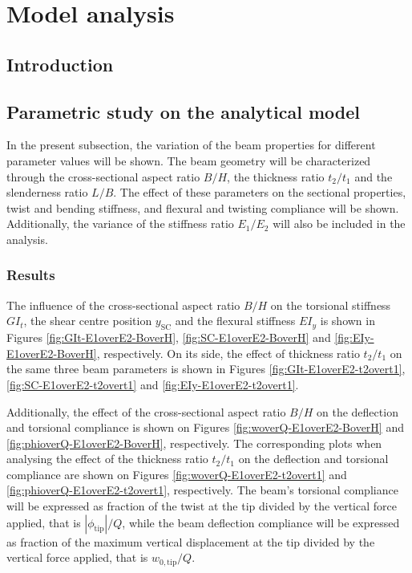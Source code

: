 \chapter{Model analysis} \label{chap:Results_model}


\section{Introduction} \label{sec:intro_Results_sim}

\section{Parametric study on the analytical model} \label{sec:analyticalParametricStudy_results_model}

  In the present subsection, the variation of the beam properties for different parameter values will be shown. The beam geometry will be characterized through the cross-sectional aspect ratio $B/H$, the thickness ratio $t_2/t_1$ and the slenderness ratio $L/B$. The effect of these parameters on the sectional properties, twist and bending stiffness, and flexural and twisting compliance will be shown. Additionally, the variance of the stiffness ratio $E_1/E_2$ will also be included in the analysis.

  \subsection{Results} \label{subsec:results_parametricStudy}

  The influence of the cross-sectional aspect ratio $B/H$ on the torsional stiffness $G I_t$, the shear centre position $y_{\mathrm{SC}}$ and the flexural stiffness $E I_y$ is shown in Figures \ref{fig:GIt-E1overE2-BoverH}, \ref{fig:SC-E1overE2-BoverH} and \ref{fig:EIy-E1overE2-BoverH}, respectively. On its side, the effect of thickness ratio $t_2/t_1$ on the same three beam parameters is shown in Figures \ref{fig:GIt-E1overE2-t2overt1}, \ref{fig:SC-E1overE2-t2overt1} and \ref{fig:EIy-E1overE2-t2overt1}.

  Additionally, the effect of the cross-sectional aspect ratio $B/H$ on the deflection and torsional compliance is shown on Figures \ref{fig:woverQ-E1overE2-BoverH} and \ref{fig:phioverQ-E1overE2-BoverH}, respectively. The corresponding plots when analysing the effect of the thickness ratio $t_2/t_1$ on the deflection and torsional compliance are shown on Figures \ref{fig:woverQ-E1overE2-t2overt1} and \ref{fig:phioverQ-E1overE2-t2overt1}, respectively. The beam's torsional compliance will be expressed as fraction of the twist at the tip divided by the vertical force applied, that is $|\phi_{\mathrm{tip}}| / Q$, while the beam deflection compliance will be expressed as fraction of the maximum vertical displacement at the tip divided by the vertical force applied, that is $w_{\mathrm{0,tip}} / Q$.

